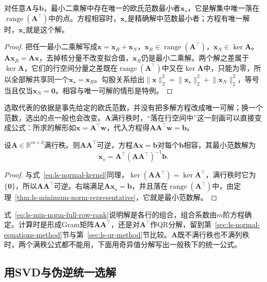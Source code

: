 \begin{theorem}[最小范数代表]
\label{thm:ls-minimum-norm-representative}
对任意$\bm A$与$\bm b$，最小二乘解中存在唯一的欧氏范数最小者$\bm x_\star$，它是解集中唯一落在$\operatorname{range}(\bm A^\top)$中的点。方程相容时，$\bm x_\star$是精确解中范数最小者；方程有唯一解时，$\bm x_\star$就是这个解。
\end{theorem}
\begin{proof}
把任一最小二乘解写成$\bm x=\bm x_R+\bm x_N$，$\bm x_R\in\operatorname{range}(\bm A^\top)$，$\bm x_N\in\ker\bm A$。$\bm A\bm x_R=\bm A\bm x$，去掉核分量不改变拟合值，$\bm x_R$仍是最小二乘解。两个解之差属于$\ker\bm A$，它们的行空间分量之差既在$\operatorname{range}(\bm A^\top)$中又在$\ker\bm A$中，只能为零，所以全部解共享同一个$\bm x_\star=\bm x_R$。勾股关系给出$\lVert\bm x\rVert_2^2=\lVert\bm x_\star\rVert_2^2+\lVert\bm x_N\rVert_2^2$，等号当且仅当$\bm x_N=\bm0$。相容与唯一可解的情形是特例。
\end{proof}

选取代表的依据是事先给定的欧氏范数，并没有把多解方程改成唯一可解；换一个范数，选出的点一般也会改变。$\bm A$满行秩时，“落在行空间中”这一刻画可以直接变成公式：所求的解形如$\bm x=\bm A^\top\bm w$，代入方程得$\bm A\bm A^\top\bm w=\bm b$。

\begin{theorem}[满行秩时的最小范数解]
\label{thm:ls-min-norm-full-row-rank}
设$\bm A\in\mathbb R^{m\times d}$满行秩。则$\bm A\bm A^\top$可逆，方程$\bm A\bm x=\bm b$对每个$\bm b$相容，其最小范数解为
\begin{equation}
 \bm x_\star=\bm A^\top(\bm A\bm A^\top)^{-1}\bm b .
 \label{eq:ls-min-norm-full-row-rank}
\end{equation}
\end{theorem}
\begin{proof}
与式~\eqref{eq:ls-normal-kernel}同理，$\ker(\bm A\bm A^\top)=\ker\bm A^\top$，满行秩时它为$\{\bm0\}$，所以$\bm A\bm A^\top$可逆。右端满足$\bm A\bm x_\star=\bm b$，并且落在$\operatorname{range}(\bm A^\top)$中，由定理~\ref{thm:ls-minimum-norm-representative}，它就是最小范数解。
\end{proof}

式~\eqref{eq:ls-min-norm-full-row-rank}说明解是各行的组合，组合系数由$m$阶方程确定。计算时是形成Gram矩阵$\bm A\bm A^\top$，还是对$\bm A^\top$作QR分解，留到第~\ref{sec:ls-normal-equations-method}节与第~\ref{sec:ls-qr-method}节比较。$\bm A$既不满行秩也不满列秩时，两个满秩公式都不能用，下面用奇异值分解写出一般秩下的统一公式。

\subsection{用SVD与伪逆统一选解}
\label{sec:ls-pseudoinverse}

